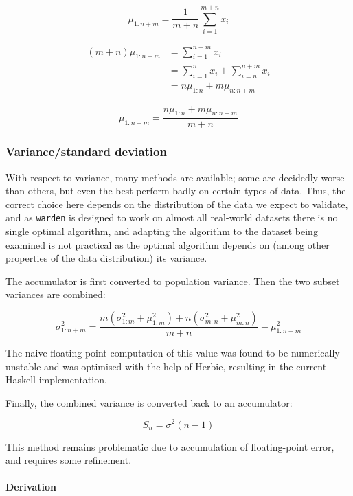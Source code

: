 \documentclass[a4paper]{article}
\begin{document}
\[\mu_{1:n+m} = \frac{1}{m+n} \sum\limits_{i=1}^{m+n} x_i\]

\[\begin{aligned}(m + n) \mu_{1:n+m} &= \sum\limits_{i=1}^{n+m} x_i \\
                                     &= \sum\limits_{i=1}^n x_i + \sum\limits_{i=n}^{n+m} x_i \\
                                     &= n\mu_{1:n} + m\mu_{n:n+m}\end{aligned}\]

\[\mu_{1:n+m} = \frac{n\mu_{1:n} + m\mu_{n:n+m}}{m + n}\]

\subsubsection{Variance/standard
deviation}\label{variancestandard-deviation}

With respect to variance, many methods are available; some are decidedly
worse than others, but even the best perform badly on certain types of
data. Thus, the correct choice here depends on the distribution of the
data we expect to validate, and as \texttt{warden} is designed to work
on almost all real-world datasets there is no single optimal algorithm,
and adapting the algorithm to the dataset being examined is not
practical as the optimal algorithm depends on (among other properties of
the data distribution) its variance.\cite{Ling1974}

The accumulator is first converted to population variance. Then the two
subset variances are combined:

\[\sigma_{1:n+m}^2 = \frac{m(\sigma_{1:m}^2 + \mu_{1:m}^2) + n(\sigma_{m:n}^2 + \mu_{m:n}^2)}{m + n} - \mu_{1:n+m}^2\]

The naive floating-point computation of this value was found to be
numerically unstable and was optimised with the help of Herbie\cite{panchekha2015},
resulting in the current Haskell implementation.

Finally, the combined variance is converted back to an accumulator:

\[S_n = \sigma^2(n - 1)\]

This method remains problematic due to accumulation of floating-point
error, and requires some refinement.

\paragraph{Derivation}\label{derivation-1}
\end{document}
